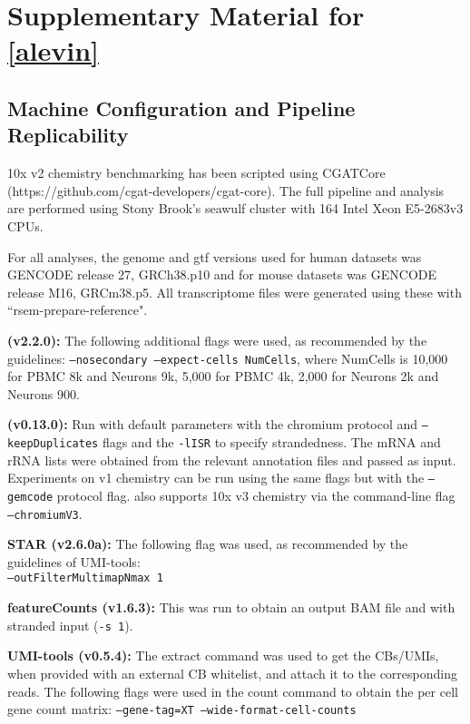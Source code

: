 \chapter{Supplementary Material for \cref{alevin}}
\label{appendix-alevin}

\section{ Machine Configuration and Pipeline Replicability }
\label{sec:tool_params}


10x v2 chemistry benchmarking has been scripted using CGATCore (https://github.com/cgat-developers/cgat-core). The full pipeline and analysis are performed using Stony Brook's seawulf cluster with 164 Intel Xeon E5-2683v3 CPUs.

For all analyses, the genome and gtf versions used for human datasets was GENCODE release 27, GRCh38.p10 and for mouse datasets was GENCODE release M16, GRCm38.p5. All transcriptome files were generated using these with ``rsem-prepare-reference".

\textbf{\cellr (v2.2.0):} The following additional flags were used, as recommended by the \cellr guidelines: \texttt{--nosecondary --expect-cells NumCells}, where NumCells is 10,000 for PBMC 8k and Neurons 9k,
5,000 for PBMC 4k, 2,000 for Neurons 2k and Neurons 900.

\textbf{\Alevin (v0.13.0):} Run with default parameters with the chromium protocol and \texttt{--keepDuplicates} flags and the \texttt{-lISR} to specify strandedness. The mRNA and rRNA lists were obtained from the relevant annotation files and passed as input. Experiments on v1 chemistry can be run using the same flags but with the \texttt{--gemcode} protocol flag.  \Alevin also supports 10x v3 chemistry via the command-line flag \texttt{--chromiumV3}.

\textbf{STAR (v2.6.0a):} The following flag was used, as recommended by the guidelines of UMI-tools: \\ \texttt{--outFilterMultimapNmax 1} 

\textbf{featureCounts (v1.6.3):} This was run to obtain an output BAM file and with stranded input (\texttt{-s 1}).

\textbf{UMI-tools (v0.5.4):} The extract command was used to get the CBs/UMIs, when provided with an external CB whitelist, and attach it to the corresponding reads. The following flags were used in the count command to obtain the per cell gene count matrix: \texttt{--gene-tag=XT --wide-format-cell-counts}

